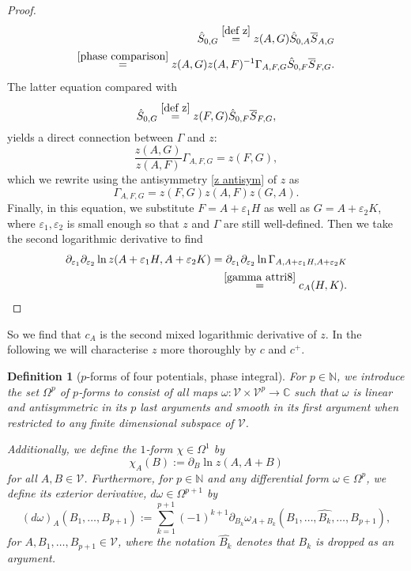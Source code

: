 \documentclass[b5paper,draft,openbib,12pt]{memoir}
\newtheorem{Def}{Definition}
\begin{document}
\begin{proof}
\begin{align}
\hat{S}_{0,G}\overset{\eqref{def z}}{=}z(A,G)\hat{S}_{0,A}\overline{S}_{A,G}\\
\overset{\eqref{phase comparison}}{=}z(A,G)z(A,F)^{-1}\Gamma_{A,F,G}\hat{S}_{0,F}\overline{S}_{F,G}.
\end{align}
The latter equation compared with 
\begin{equation}
\hat{S}_{0,G}\overset{\eqref{def z}}{=}z(F,G)\hat{S}_{0,F}\overline{S}_{F,G},
\end{equation}
yields  a direct connection between \(\Gamma\) and \(z\):
\begin{equation}
\frac{z(A,G)}{z(A,F)}\Gamma_{A,F,G}=z(F,G),
\end{equation}
which we rewrite using the antisymmetry 
\eqref{z antisym} of \(z\)  as
\begin{equation}
\Gamma_{A,F,G}=z(F,G)z(A,F)z(G,A).
\end{equation}
Finally, in this equation, we substitute 
\(F=A+\varepsilon_1 H\) as well as  
\(G=A+\varepsilon_2 K\), where 
\(\varepsilon_1,\varepsilon_2\) is small enough so that 
\(z\) and \(\Gamma\) are still well-defined. Then we 
take the second logarithmic derivative to find
\begin{align}\notag
 \partial_{\varepsilon_1}\partial_{\varepsilon_2}\ln  z(A+\varepsilon_1 H,A+\varepsilon_2 K)=\partial_{\varepsilon_1}\partial_{\varepsilon_2}\ln\Gamma_{A,A+\varepsilon_1 H,A+\varepsilon_2 K}\\
 \overset{\eqref{gamma attri8}}{=}c_A(H,K). 
\end{align}

\end{proof}

So we find that \(c_A\) is the second mixed logarithmic 
derivative of \(z\). In the following we will 
characterise \(z\) more thoroughly by \(c\) and \(c^+\).
\begin{Def}[\(p\)-forms of four potentials, phase integral]
For \(p\in\mathbb{N}\), we introduce the set \(\Omega^p\) 
of \(p\)-forms 
to consist of all maps 
\(\omega: \mathcal{V}\times \mathcal{V}^{p}\rightarrow \mathbb{C}\)
such that \(\omega\) is linear and antisymmetric in its 
\(p\) last arguments and smooth in its first argument
when restricted to any finite
dimensional subspace of \(\mathcal{V}\).

Additionally, we define the \(1\)-form 
\(\chi\in \Omega^1\) by
\begin{equation}\label{de chi}
\chi_A(B):=\partial_B\ln z(A,A+B)
\end{equation}
for all \(A,B\in\mathcal{V}\).
Furthermore, for \(p\in\mathbb{N}\) and any differential 
form \(\omega\in \Omega^p\), 
we define its exterior derivative, 
\(d \omega\in\Omega^{p+1}\) by
\begin{equation}
(d\omega)_A(B_1,\dots, B_{p+1}):=\sum_{k=1}^{p+1} (-1)^{k+1} 
\partial_{B_k}\omega_{A+B_k}(B_1,\dots , \widehat{B_k},\dots, B_{p+1}),
\end{equation}
for \(A,B_1,\dots, B_{p+1}\in\mathcal{V}\), where 
the notation \(\widehat{B_k}\) denotes that \(B_k\) is  
dropped as an argument.

\end{Def}
\end{document}
